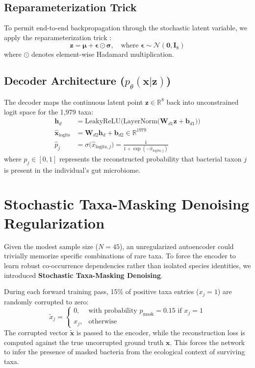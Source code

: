 \subsection{Reparameterization Trick}
To permit end-to-end backpropagation through the stochastic latent variable, we apply the reparameterization trick \cite{kingma2013auto}:
\begin{equation}
    \mathbf{z} = \boldsymbol{\mu} + \boldsymbol{\epsilon} \odot \boldsymbol{\sigma}, \quad \text{where } \boldsymbol{\epsilon} \sim \mathcal{N}(\mathbf{0}, \mathbf{I}_8)
\end{equation}
where $\odot$ denotes element-wise Hadamard multiplication.

\subsection{Decoder Architecture ($p_\theta(\mathbf{x}|\mathbf{z})$)}
The decoder maps the continuous latent point $\mathbf{z} \in \mathbb{R}^8$ back into unconstrained logit space for the 1,979 taxa:
\begin{align}
    \mathbf{h}_d &= \text{LeakyReLU}\Big(\text{LayerNorm}\big(\mathbf{W}_{d1} \mathbf{z} + \mathbf{b}_{d1}\big)\Big) \\
    \hat{\mathbf{x}}_{\text{logits}} &= \mathbf{W}_{d2} \mathbf{h}_d + \mathbf{b}_{d2} \in \mathbb{R}^{1979} \\
    \hat{p}_j &= \sigma\big(\hat{x}_{\text{logits}, j}\big) = \frac{1}{1 + \exp(-\hat{x}_{\text{logits}, j})}
\end{align}
where $\hat{p}_j \in [0, 1]$ represents the reconstructed probability that bacterial taxon $j$ is present in the individual's gut microbiome.

\section{Stochastic Taxa-Masking Denoising Regularization}
Given the modest sample size ($N = 45$), an unregularized autoencoder could trivially memorize specific combinations of rare taxa. To force the encoder to learn robust co-occurrence dependencies rather than isolated species identities, we introduced \textbf{Stochastic Taxa-Masking Denoising}.

During each forward training pass, 15\% of positive taxa entries ($x_j = 1$) are randomly corrupted to zero:
\begin{equation}
    \tilde{x}_j = 
    \begin{cases}
    0, & \text{with probability } p_{\text{mask}} = 0.15 \text{ if } x_j = 1 \\
    x_j, & \text{otherwise}
    \end{cases}
\end{equation}
The corrupted vector $\tilde{\mathbf{x}}$ is passed to the encoder, while the reconstruction loss is computed against the true uncorrupted ground truth $\mathbf{x}$. This forces the network to infer the presence of masked bacteria from the ecological context of surviving taxa.

